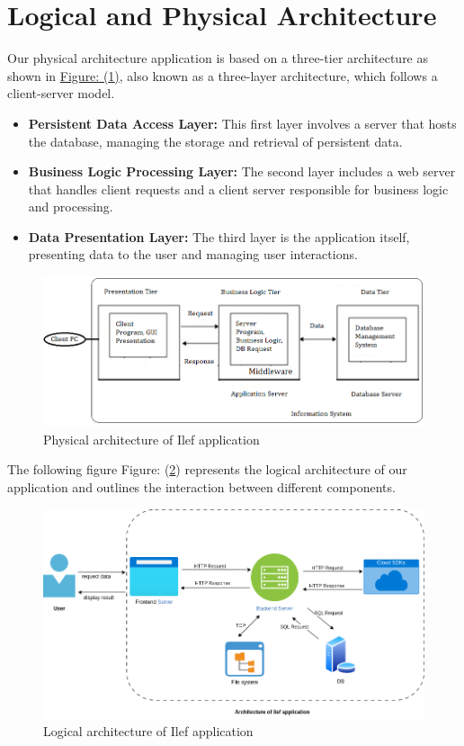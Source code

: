 \section{Logical and Physical Architecture}

Our physical architecture application is based on a three-tier architecture as shown in \hyperref[fig:archi-phy]{Figure: (\ref{fig:archi-phy})}, also known as a three-layer architecture, which follows a client-server model.
\begin{itemize}
  \item \textbf{Persistent Data Access Layer:}  This first layer involves a server that hosts the database, managing the storage and retrieval of persistent data.
  \item \textbf{Business Logic Processing Layer:}  The second layer includes a web server that handles client requests and a client server responsible for business logic and processing.
  \item \textbf{Data Presentation Layer:}   The third layer is the application itself, presenting data to the user and managing user interactions.
\end{itemize}

\begin{figure}[h]
  \center
  \includegraphics[width=17cm]{./chapters/preliminary_study/archi-phy.png}
  \caption{Physical architecture of Ilef application}
  \label{fig:archi-phy}
\end{figure}


The following figure {Figure: (\ref{fig:archi-log})} represents the logical architecture of our application and outlines the interaction between different components.
\vspace*{3cm}

\begin{figure}[h]
  \center
  \includegraphics[width=15cm]{./chapters/preliminary_study/archi-logique.png}
  \caption{Logical architecture of Ilef application}
  \label{fig:archi-log}
\end{figure}

